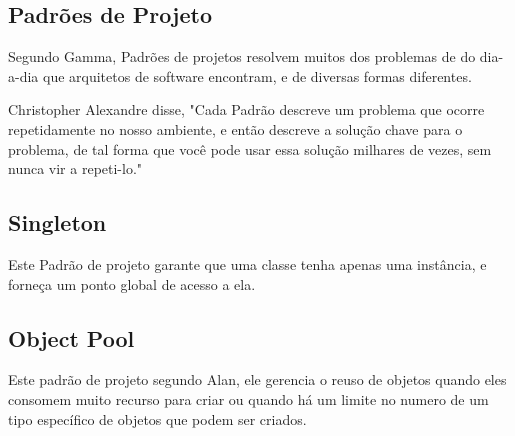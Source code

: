 \subsection{Padrões de Projeto}	
Segundo Gamma, Padrões de projetos resolvem muitos dos problemas de  do dia-a-dia que arquitetos de software encontram, e de diversas formas diferentes. \cite{gram}   

Christopher Alexandre disse, "Cada Padrão descreve um problema que ocorre repetidamente no nosso ambiente, e então descreve a solução chave para o problema, de tal forma que você pode usar essa solução milhares de vezes, sem nunca vir a repeti-lo." \cite{cris} 

\subsection{Singleton}	
Este Padrão de projeto garante que uma classe tenha apenas uma instância, e forneça um ponto global de acesso a ela.  \cite{gra} 

\subsection{Object Pool}	
Este padrão de projeto segundo Alan, ele gerencia o reuso de objetos quando eles consomem muito recurso para criar ou quando há um limite no numero de um tipo específico de objetos que podem ser criados. \cite{alan}
